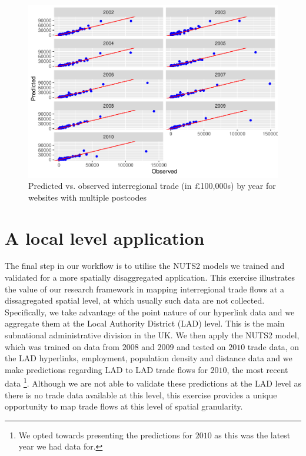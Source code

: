 \documentclass[]{interact}
\theoremstyle{plain}%
\theoremstyle{definition}
\theoremstyle{remark}
\begin{document}
\begin{figure}[p]
\includegraphics[width=1\linewidth]{hl_v2_files/figure-latex/unnamed-chunk-12-1} \caption{\label{prediction_multi_pc}Predicted vs. observed interregional trade (in £100,000s) by year for websites with multiple postcodes}\label{fig:unnamed-chunk-12}
\end{figure}

\hypertarget{a-local-level-application}{%
\section{A local level application}\label{a-local-level-application}}

The final step in our workflow is to utilise the NUTS2 models we trained
and validated for a more spatially disaggregated application. This
exercise illustrates the value of our research framework in mapping
interregional trade flows at a dissagregated spatial level, at which
usually such data are not collected. Specifically, we take advantage of
the point nature of our hyperlink data and we aggregate them at the
Local Authority District (LAD) level. This is the main subnational
administrative division in the UK. We then apply the NUTS2 model, which
was trained on data from \(2008\) and \(2009\) and tested on \(2010\)
trade data, on the LAD hyperlinks, employment, population density and
distance data and we make predictions regarding LAD to LAD trade flows
for \(2010\), the most recent data \footnote{We opted towards presenting
  the predictions for \(2010\) as this was the latest year we had data
  for.}. Although we are not able to validate these predictions at the
LAD level as there is no trade data available at this level, this
exercise provides a unique opportunity to map trade flows at this level
of spatial granularity.
\end{document}
